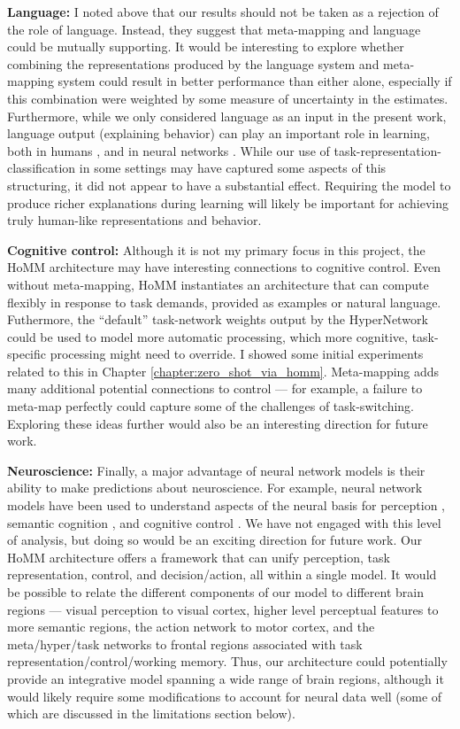 \textbf{Language:} I noted above that our results should not be taken as a rejection of the role of language. Instead, they suggest that meta-mapping and language could be mutually supporting. It would be interesting to explore whether combining the representations produced by the language system and meta-mapping system could result in better performance than either alone, especially if this combination were weighted by some measure of uncertainty in the estimates. Furthermore, while we only considered language as an input in the present work, language output (explaining behavior) can play an important role in learning, both in humans \citep{Chi1994}, and in neural networks \citep{Mu2019}. While our use of task-representation-classification in some settings may have captured some aspects of this structuring, it did not appear to have a substantial effect. Requiring the model to produce richer explanations during learning will likely be important for achieving truly human-like representations and behavior. 

\textbf{Cognitive control:} Although it is not my primary focus in this project, the HoMM architecture may have interesting connections to cognitive control. Even without meta-mapping, HoMM instantiates an architecture that can compute flexibly in response to task demands, provided as examples or natural language. Futhermore, the ``default'' task-network weights output by the HyperNetwork could be used to model more automatic processing, which more cognitive, task-specific processing might need to override. I showed some initial experiments related to this in Chapter \ref{chapter:zero_shot_via_homm}. Meta-mapping adds many additional potential connections to control --- for example, a failure to meta-map perfectly could capture some of the challenges of task-switching. Exploring these ideas further would also be an interesting direction for future work. \par

\textbf{Neuroscience:} Finally, a major advantage of neural network models is their ability to make predictions about neuroscience. For example, neural network models have been used to understand aspects of the neural basis for perception \citep{Yamins2016a}, semantic cognition \citep{Rogers2004}, and cognitive control \citep{Shenhav2013}. We have not engaged with this level of analysis, but doing so would be an exciting direction for future work. Our HoMM architecture offers a framework that can unify perception, task representation, control, and decision/action, all within a single model. It would be possible to relate the different components of our model to different brain regions --- visual perception to visual cortex, higher level perceptual features to more semantic regions, the action network to motor cortex, and the meta/hyper/task networks to frontal regions associated with task representation/control/working memory. Thus, our architecture could potentially provide an integrative model spanning a wide range of brain regions, although it would likely require some modifications to account for neural data well (some of which are discussed in the limitations section below). \par 

